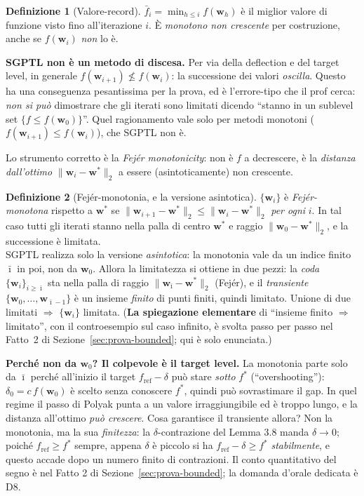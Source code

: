\documentclass[11pt,a4paper]{article}
\theoremstyle{definition}
\newtheorem{definition}{Definizione}
\newcommand{\w}{\bm{w}}
\newcommand{\wstar}{\w^{*}}
\newcommand{\fstar}{f^{*}}
\newcommand{\fref}{f_{\mathrm{ref}}}
\newcommand{\fbar}{\bar{f}}
\newcommand{\norm}[1]{\lVert #1\rVert}
\begin{document}
\begin{definition}[Valore-record]
$\fbar_i=\min_{h\le i}f(\w_h)$ è il miglior valore di funzione visto fino all'iterazione $i$.
È \emph{monotono non crescente} per costruzione, anche se $f(\w_i)$ \emph{non} lo è.
\end{definition}

\begin{warnbox}
\textbf{SGPTL non è un metodo di discesa.} Per via della deflection e del target level, in
generale $f(\w_{i+1})\not\le f(\w_i)$: la successione dei valori \emph{oscilla}. Questo ha una
conseguenza pesantissima per la prova, ed è l'errore-tipo che il prof cerca:
\emph{non si può} dimostrare che gli iterati sono limitati dicendo ``stanno in un sublevel set
$\{f\le f(\w_0)\}$''. Quel ragionamento vale solo per metodi monotoni
($f(\w_{i+1})\le f(\w_i)$), che SGPTL non è.
\end{warnbox}

Lo strumento corretto è la \emph{Fej\'er monotonicity}: non è $f$ a decrescere, è la
\emph{distanza dall'ottimo} $\norm{\w_i-\wstar}_2$ a essere (asintoticamente) non crescente.

\begin{definition}[Fej\'er-monotonia, e la versione asintotica]
$\{\w_i\}$ è \emph{Fej\'er-monotona} rispetto a $\wstar$ se
$\norm{\w_{i+1}-\wstar}_2\le\norm{\w_i-\wstar}_2$ \emph{per ogni} $i$. In tal caso tutti gli
iterati stanno nella palla di centro $\wstar$ e raggio $\norm{\w_0-\wstar}_2$, e la
successione è limitata.
\\[3pt]
SGPTL realizza solo la versione \emph{asintotica}: la monotonia vale da un indice finito
$\bar\imath$ in poi, non da $\w_0$. Allora la limitatezza si ottiene in due pezzi: la
\emph{coda} $\{\w_i\}_{i\ge\bar\imath}$ sta nella palla di raggio $\norm{\w_{\bar\imath}-\wstar}_2$
(Fej\'er), e il \emph{transiente} $\{\w_0,\dots,\w_{\bar\imath-1}\}$ è un insieme \emph{finito}
di punti finiti, quindi limitato. Unione di due limitati $\Rightarrow$ $\{\w_i\}$ limitata.
(\textbf{La spiegazione elementare} di ``insieme finito $\Rightarrow$ limitato'', con il
controesempio sul caso infinito, è svolta passo per passo nel Fatto~2 di
Sezione~\ref{sec:prova-bounded}; qui è solo enunciata.)
\end{definition}

\begin{warnbox}
\textbf{Perché non da $\w_0$? Il colpevole è il target level.} La monotonia parte solo da
$\bar\imath$ perché all'inizio il target $\fref-\delta$ può stare \emph{sotto} $\fstar$
(``overshooting''): $\delta_0=c\,f(\w_0)$ è scelto senza conoscere $\fstar$, quindi può
sovrastimare il gap. In quel regime il passo di Polyak punta a un valore irraggiungibile ed è
troppo lungo, e la distanza all'ottimo \emph{può crescere}. Cosa garantisce il transiente
allora? Non la monotonia, ma la sua \emph{finitezza}: la $\delta$-contrazione del Lemma 3.8
manda $\delta\to0$; poiché $\fref\ge\fstar$ sempre, appena $\delta$ è piccolo si ha
$\fref-\delta\ge\fstar$ \emph{stabilmente}, e questo accade dopo un numero finito di
contrazioni. Il conto quantitativo del segno è nel Fatto 2 di
Sezione~\ref{sec:prova-bounded}; la domanda d'orale dedicata è D8.
\end{warnbox}
\end{document}
